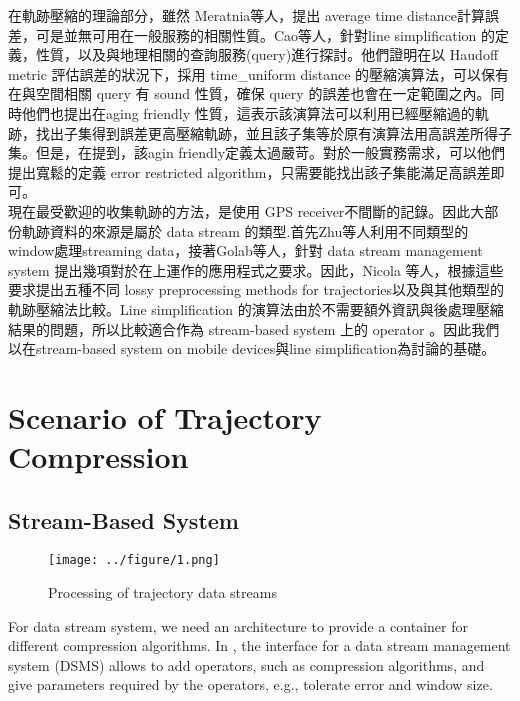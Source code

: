 \documentclass[12pt]{article}
\begin{document}
\begin{CJK}{UTF8}{bsmi}
在軌跡壓縮的理論部分，雖然 Meratnia\cite{2004:TDTROPW}等人，提出 average time distance計算誤差，可是並無可用在一般服務的相關性質。Cao\cite{2006:Cao}等人，針對line simplification 的定義，性質，以及與地理相關的查詢服務(query)進行探討。他們證明在以 Haudoff metric 評估誤差的狀況下，採用 time\_uniform distance 的壓縮演算法，可以保有在與空間相關 query 有 sound 性質，確保 query 的誤差也會在一定範圍之內。同時他們也提出在aging friendly 性質，這表示該演算法可以利用已經壓縮過的軌跡，找出子集得到誤差更高壓縮軌跡，並且該子集等於原有演算法用高誤差所得子集。但是，在\cite{streamdataGIS}提到，該agin friendly定義太過嚴苛。對於一般實務需求，可以他們提出寬鬆的定義 error restricted algorithm，只需要能找出該子集能滿足高誤差即可。\\


現在最受歡迎的收集軌跡的方法，是使用 GPS receiver不間斷的記錄。因此大部份軌跡資料的來源是屬於 data stream 的類型.首先Zhu等人\cite{2002:VLDB_window}利用不同類型的window處理streaming data，接著Golab等人\cite{2003Issues}，針對 data stream management system 提出幾項對於在上運作的應用程式之要求。因此，Nicola 等人，根據這些要求提出五種不同 lossy preprocessing methods for trajectories\cite{2008:MDM_preprocess}以及與其他類型的軌跡壓縮法比較\cite{streamdataGIS}。Line simplification 的演算法由於不需要額外資訊與後處理壓縮結果的問題，所以比較適合作為 stream-based system 上的 operator 。因此我們以在stream-based system on mobile devices與line simplification為討論的基礎。\\






\section{Scenario of Trajectory Compression}




\subsection{Stream-Based System}



\begin{figure}[ht]
\begin{center}
\texttt{[image: ../figure/1.png]}
\caption{Processing of trajectory data streams}
\label{fig:proTDS}
\end{center}
\end{figure}


For data stream system, we need an architecture to provide a container for different compression algorithms. In \cite{streamdataGIS}, the interface for a data stream management system (DSMS)\cite{2001:DSMS} allows to add operators, such as compression algorithms, and give parameters required by the operators, e.g., tolerate error and window size.\\


\end{CJK}
\end{document}
